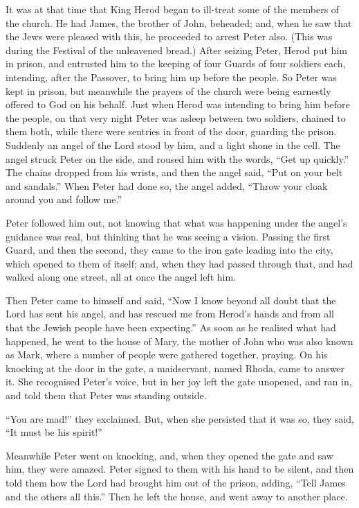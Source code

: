  It was at that time that King Herod began to ill-treat some
of the members of the church.  He had James, the brother of
John, beheaded;  and, when he saw that the Jews were pleased
with this, he proceeded to arrest Peter also. (This was during the
Festival of the unleavened bread.)  After seizing Peter,
Herod put him in prison, and entrusted him to the keeping of four Guards
of four soldiers each, intending, after the Passover, to bring him up
before the people.  So Peter was kept in prison, but
meanwhile the prayers of the church were being earnestly offered to God
on his behalf.  Just when Herod was intending to bring him
before the people, on that very night Peter was asleep between two
soldiers, chained to them both, while there were sentries in front of
the door, guarding the prison.  Suddenly an angel of the
Lord stood by him, and a light shone in the cell. The angel struck Peter
on the side, and roused him with the words, ``Get up quickly.''
 The chains dropped from his wrists, and then the angel
said, ``Put on your belt and sandals.'' When Peter had done so, the
angel added, ``Throw your cloak around you and follow me.''

 Peter followed him out, not knowing that what was happening
under the angel's guidance was real, but thinking that he was seeing a
vision.  Passing the first Guard, and then the second, they
came to the iron gate leading into the city, which opened to them of
itself; and, when they had passed through that, and had walked along one
street, all at once the angel left him.

 Then Peter came to himself and said, ``Now I know beyond
all doubt that the Lord has sent his angel, and has rescued me from
Herod's hands and from all that the Jewish people have been expecting.''
 As soon as he realised what had happened, he went to the
house of Mary, the mother of John who was also known as Mark, where a
number of people were gathered together, praying.  On his
knocking at the door in the gate, a maidservant, named Rhoda, came to
answer it.  She recognised Peter's voice, but in her joy
left the gate unopened, and ran in, and told them that Peter was
standing outside.

 ``You are mad!'' they exclaimed. But, when she persisted
that it was so, they said, ``It must be his spirit!''

 Meanwhile Peter went on knocking, and, when they opened
the gate and saw him, they were amazed.  Peter signed to
them with his hand to be silent, and then told them how the Lord had
brought him out of the prison, adding, ``Tell James and the others all
this.'' Then he left the house, and went away to another place.

